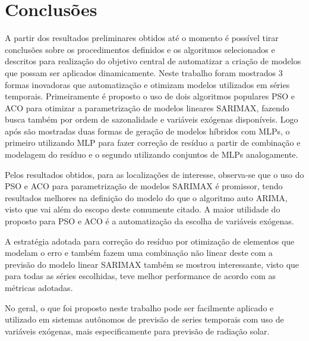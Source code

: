 \chapter{Conclusões}
\label{cap:conclusoes}

A partir dos resultados preliminares obtidos até o momento é possível tirar conclusões sobre os procedimentos definidos e os algoritmos selecionados e descritos para realização do objetivo central de automatizar a criação de modelos que possam ser aplicados dinamicamente. Neste trabalho foram mostrados 3 formas inovadoras que automatização e otimizam modelos utilizados em séries temporais. Primeiramente é proposto o uso de dois algoritmos populares PSO e ACO para otimizar a parametrização de modelos lineares SARIMAX, fazendo busca também por ordem de sazonalidade e variáveis exógenas disponíveis. Logo após são mostradas duas formas de geração de modelos híbridos com MLPs, o primeiro utilizando MLP para fazer correção de resíduo a partir de combinação e modelagem do resíduo e o segundo utilizando conjuntos de MLPs analogamente.

Pelos resultados obtidos, para as localizações de interesse, observa-se que o uso do PSO e ACO para parametrização de modelos SARIMAX é promissor, tendo resultados melhores na definição do modelo do que o algoritmo auto ARIMA, visto que vai além do escopo deste comumente citado. A maior utilidade do proposto para PSO e ACO é a automatização da escolha de variáveis exógenas.

A estratégia adotada para correção do resíduo por otimização de elementos que modelam o erro e também fazem uma combinação não linear deste com a previsão do modelo linear SARIMAX também se mostrou interessante, visto que para todas as séries escolhidas, teve melhor performance de acordo com as métricas adotadas.

No geral, o que foi proposto neste trabalho pode ser facilmente aplicado e utilizado em sistemas autônomos de previsão de series temporais com uso de variáveis exógenas, mais especificamente para previsão de radiação solar.